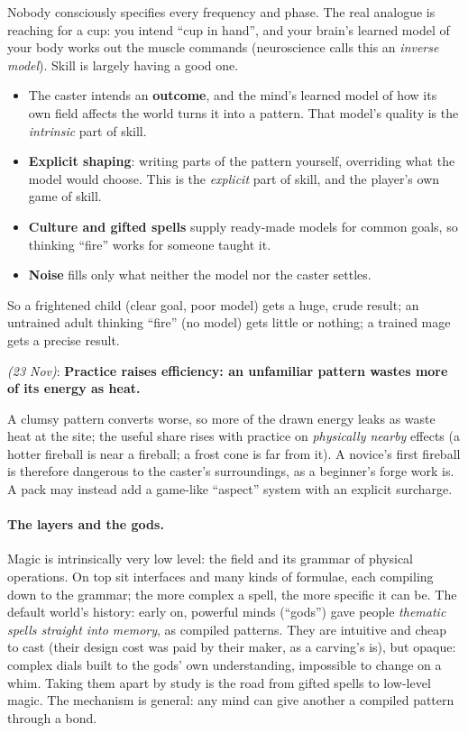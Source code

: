 \documentclass[11pt,a4paper]{article}
\newcommand{\decision}[3]{\par\smallskip\noindent{\color{dec}\textbf{Decision #1}} \textit{(#2)}: \textbf{#3}\par}
\begin{document}
Nobody consciously specifies every frequency and phase. The real analogue is reaching for a cup: you intend ``cup in hand'', and your brain's learned model of your body works out the muscle commands (neuroscience calls this an \emph{inverse model}). Skill is largely having a good one.
\begin{itemize}
  \item The caster intends an \textbf{outcome}, and the mind's learned model of how its own field affects the world turns it into a pattern. That model's quality is the \emph{intrinsic} part of skill.
  \item \textbf{Explicit shaping}: writing parts of the pattern yourself, overriding what the model would choose. This is the \emph{explicit} part of skill, and the player's own game of skill.
  \item \textbf{Culture and gifted spells} supply ready-made models for common goals, so thinking ``fire'' works for someone taught it.
  \item \textbf{Noise} fills only what neither the model nor the caster settles.
\end{itemize}
So a frightened child (clear goal, poor model) gets a huge, crude result; an untrained adult thinking ``fire'' (no model) gets little or nothing; a trained mage gets a precise result.

\decision{MS1}{23 Nov}{Practice raises efficiency: an unfamiliar pattern wastes more of its energy as heat.}

A clumsy pattern converts worse, so more of the drawn energy leaks as waste heat at the site; the useful share rises with practice on \emph{physically nearby} effects (a hotter fireball is near a fireball; a frost cone is far from it). A novice's first fireball is therefore dangerous to the caster's surroundings, as a beginner's forge work is. A pack may instead add a game-like ``aspect'' system with an explicit surcharge.

\paragraph{The layers and the gods.} Magic is intrinsically very low level: the field and its grammar of physical operations. On top sit interfaces and many kinds of formulae, each compiling down to the grammar; the more complex a spell, the more specific it can be. The default world's history: early on, powerful minds (``gods'') gave people \emph{thematic spells straight into memory}, as compiled patterns. They are intuitive and cheap to cast (their design cost was paid by their maker, as a carving's is), but opaque: complex dials built to the gods' own understanding, impossible to change on a whim. Taking them apart by study is the road from gifted spells to low-level magic. The mechanism is general: any mind can give another a compiled pattern through a bond.
\end{document}

